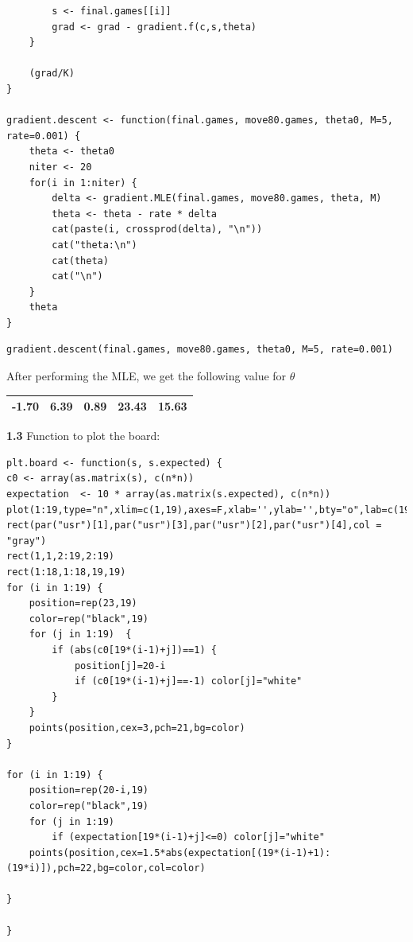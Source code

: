 \documentclass[11pt]{article}
\begin{document}
\begin{verbatim}
        s <- final.games[[i]]
        grad <- grad - gradient.f(c,s,theta)
    }

    (grad/K)
}

gradient.descent <- function(final.games, move80.games, theta0, M=5, rate=0.001) {
    theta <- theta0
    niter <- 20
    for(i in 1:niter) {
        delta <- gradient.MLE(final.games, move80.games, theta, M)
        theta <- theta - rate * delta
        cat(paste(i, crossprod(delta), "\n"))
        cat("theta:\n")
        cat(theta)
        cat("\n")
    }
    theta
}
\end{verbatim}


\begin{verbatim}
gradient.descent(final.games, move80.games, theta0, M=5, rate=0.001)
\end{verbatim}

After performing the MLE, we get the following value for \(\theta\)

\begin{center}
\begin{tabular}{rrrrr}
\hline
-1.70 & 6.39 & 0.89 & 23.43 & 15.63\\
\hline
\end{tabular}
\end{center}


\textbf{1.3}
Function to plot the board:
\begin{verbatim}
plt.board <- function(s, s.expected) {
c0 <- array(as.matrix(s), c(n*n))
expectation  <- 10 * array(as.matrix(s.expected), c(n*n))
plot(1:19,type="n",xlim=c(1,19),axes=F,xlab='',ylab='',bty="o",lab=c(19,19,1))
rect(par("usr")[1],par("usr")[3],par("usr")[2],par("usr")[4],col = "gray")
rect(1,1,2:19,2:19)
rect(1:18,1:18,19,19)
for (i in 1:19) {
    position=rep(23,19)
    color=rep("black",19)
    for (j in 1:19)  {
        if (abs(c0[19*(i-1)+j])==1) {
            position[j]=20-i
            if (c0[19*(i-1)+j]==-1) color[j]="white"
        }
    }
    points(position,cex=3,pch=21,bg=color)
}

for (i in 1:19) {
    position=rep(20-i,19)
    color=rep("black",19)
    for (j in 1:19) 
        if (expectation[19*(i-1)+j]<=0) color[j]="white"
    points(position,cex=1.5*abs(expectation[(19*(i-1)+1):(19*i)]),pch=22,bg=color,col=color)

}

}
\end{verbatim}
\end{document}

